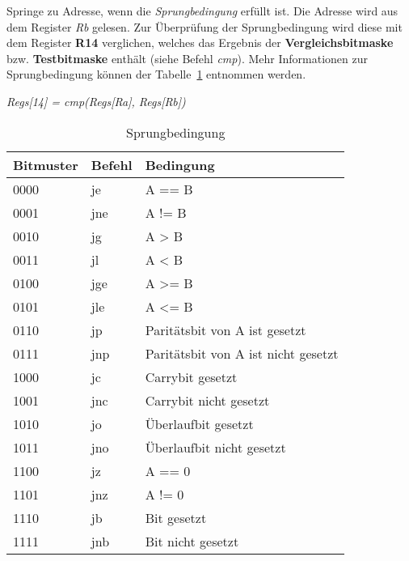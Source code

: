 
Springe zu Adresse, wenn die \textit{Sprungbedingung} erfüllt ist. Die Adresse
wird aus dem Register \textit{Rb} gelesen. Zur Überprüfung der Sprungbedingung
wird diese mit dem Register \textbf{R14} verglichen, welches das Ergebnis der
\textbf{Vergleichsbitmaske} bzw. \textbf{Testbitmaske} enthält (siehe Befehl
\textit{cmp}). Mehr Informationen zur Sprungbedingung können der
Tabelle~\ref{tab:sprungbedingung} entnommen werden.

\textit{Regs[14] = cmp(Regs[Ra], Regs[Rb])}

\begin{table}[!htb]
\centering
\begin{tabular}{lll}
\toprule
Bitmuster & Befehl & Bedingung\\
\midrule
0000 & je  & A == B\\
0001 & jne  & A != B\\
0010 & jg  & A > B\\
0011 & jl  & A < B\\
0100 & jge  & A >= B\\
0101 & jle  & A <= B\\
0110 & jp  & Paritätsbit von A ist gesetzt\\
0111 & jnp  & Paritätsbit von A ist nicht gesetzt\\
1000 & jc  & Carrybit gesetzt\\
1001 & jnc  & Carrybit nicht gesetzt\\
1010 & jo & Überlaufbit gesetzt\\
1011 & jno & Überlaufbit nicht gesetzt\\
1100 & jz & A == 0\\
1101 & jnz & A != 0\\
1110 & jb & Bit gesetzt\\
1111 & jnb  & Bit nicht gesetzt\\
\bottomrule
\end{tabular}
\caption{Sprungbedingung}
\label{tab:sprungbedingung}
\end{table}
